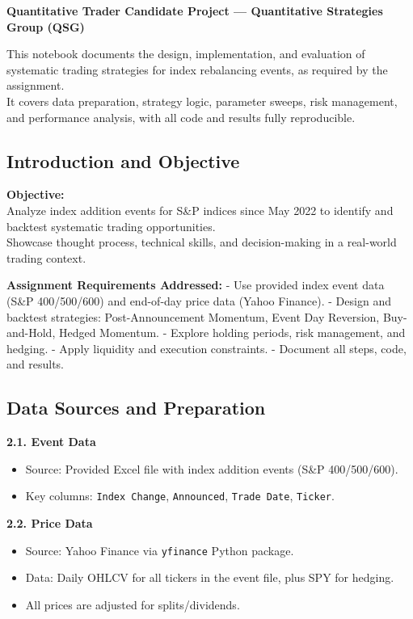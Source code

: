 \documentclass[11pt]{article}
\providecommand{\tightlist}{%
      \setlength{\itemsep}{0pt}\setlength{\parskip}{0pt}}
\begin{document}
    \textbf{Quantitative Trader Candidate Project --- Quantitative
Strategies Group (QSG)}

This notebook documents the design, implementation, and evaluation of
systematic trading strategies for index rebalancing events, as required
by the assignment.\\
It covers data preparation, strategy logic, parameter sweeps, risk
management, and performance analysis, with all code and results fully
reproducible.

    \subsection*{Introduction and Objective}

\textbf{Objective:}\\
Analyze index addition events for S\&P indices since May 2022 to
identify and backtest systematic trading opportunities.\\
Showcase thought process, technical skills, and decision-making in a
real-world trading context.

\textbf{Assignment Requirements Addressed:} - Use provided index event
data (S\&P 400/500/600) and end-of-day price data (Yahoo Finance). -
Design and backtest strategies: Post-Announcement Momentum, Event Day
Reversion, Buy-and-Hold, Hedged Momentum. - Explore holding periods,
risk management, and hedging. - Apply liquidity and execution
constraints. - Document all steps, code, and results.

    \subsection*{Data Sources and Preparation}

\textbf{2.1. Event Data}

\begin{itemize}
\tightlist
\item
  Source: Provided Excel file with index addition events (S\&P
  400/500/600).
\item
  Key columns: \texttt{Index\ Change}, \texttt{Announced},
  \texttt{Trade\ Date}, \texttt{Ticker}.
\end{itemize}

\textbf{2.2. Price Data}

\begin{itemize}
\tightlist
\item
  Source: Yahoo Finance via \texttt{yfinance} Python package.
\item
  Data: Daily OHLCV for all tickers in the event file, plus SPY for
  hedging.
\item
  All prices are adjusted for splits/dividends.
\end{itemize}
\end{document}
